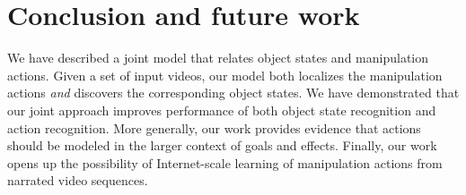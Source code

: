 
\section{Conclusion and future work}
\vspace{-2mm}
We have described a joint model that relates object states and manipulation actions.
Given a set of input videos, our model both localizes the manipulation actions \emph{and} discovers the corresponding object states. 
We have demonstrated that our joint approach improves performance of both object state recognition and action recognition. 
More generally, our work provides evidence that actions should be modeled in the larger context of goals and effects.
Finally, our work opens up the possibility of Internet-scale learning of manipulation actions from narrated video sequences.
%
